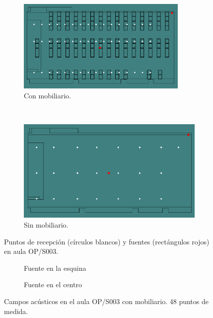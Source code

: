 \begin{figure}[ht]
    \centering
    \begin{subfigure}[b]{0.4\textwidth}
    	\centering
        \includegraphics[width=0.9\textwidth]{archivos/receptoresop.png}
        \caption{Con mobiliario.}
    \end{subfigure}
    ~ %
    \begin{subfigure}[b]{0.4\textwidth}
    	\centering
        \includegraphics[width=0.9\linewidth]{archivos/receptoresopv.png}
        \caption{Sin mobiliario.}
    \end{subfigure}
    \caption{Puntos de recepción (círculos blancos) y fuentes (rectángulos rojos) en aula OP/S003.}\label{im:receptoresop}
\end{figure}
\FloatBarrier 


\begin{figure}[ht]
    \begin{subfigure}[b]{0.4\textwidth}
    	\centering%
         {%
    }
    \caption{Fuente en la esquina}%
    \end{subfigure}%
    \hspace{1.9cm}%
    \begin{subfigure}[b]{0.4\textwidth}%
    	\centering%
        {%
    }
    \caption{Fuente en el centro}%
    \end{subfigure}
    \caption{Campos acústicos en el aula OP/S003 con mobiliario. 48 puntos de medida.}
\label{graf:opmob}%
\end{figure}
\FloatBarrier 

